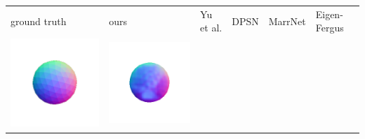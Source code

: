 \begin{center}
\begin{tabularx}{\linewidth}{@{}Y@{}Y@{}Y@{}Y@{}Y@{}Y@{}}
ground truth & ours & Yu et al. & DPSN & MarrNet & Eigen-Fergus \\
\includegraphics[width=\linewidth]{semisynthetic/20160617_1_gt.png} &
\includegraphics[width=\linewidth]{semisynthetic/20160617_1_ours_out.png} &

\end{tabularx}
\end{center}
